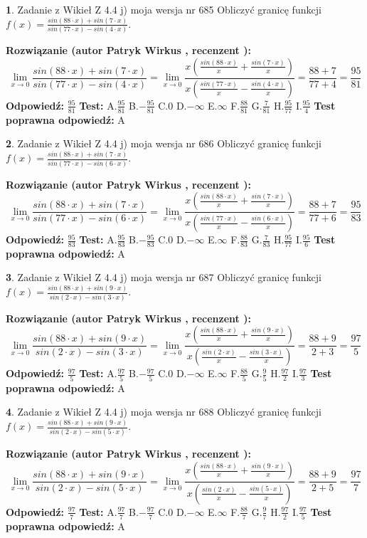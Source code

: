\documentclass[12pt, a4paper]{article}
\theoremstyle{definition} %
\newtheorem{zad}{}
\newcommand{\zadStart}[1]{\begin{zad}#1\newline}
\newcommand{\zadStop}{\end{zad}}
\newcommand{\rozwStart}[2]{\noindent \textbf{Rozwiązanie (autor #1 , recenzent #2): }\newline}
\newcommand{\rozwStop}{\newline}
\newcommand{\odpStart}{\noindent \textbf{Odpowiedź:}\newline}
\newcommand{\odpStop}{\newline}
\newcommand{\testStart}{\noindent \textbf{Test:}\newline}
\newcommand{\testStop}{\newline}
\newcommand{\kluczStart}{\noindent \textbf{Test poprawna odpowiedź:}\newline}
\newcommand{\kluczStop}{\newline}
\begin{document}
\zadStart{Zadanie z Wikieł Z 4.4 j) moja wersja nr 685}
Obliczyć granicę funkcji $f(x)=\frac{sin(88\cdot x) +sin(7\cdot x)}{sin(77\cdot x) -sin(4\cdot x)}$.
\zadStop
\rozwStart{Patryk Wirkus}{}
$$\lim\limits_{x\to 0}\frac{sin(88\cdot x) +sin(7\cdot x)}{sin(77\cdot x) -sin(4\cdot x)}=\lim\limits_{x\to 0}\frac{x(\frac{sin(88\cdot x)}{x}+\frac{sin(7\cdot x)}{x})}{x(\frac{sin(77\cdot x)}{x}-\frac{sin(4\cdot x)}{x})}=\frac{88+7}{77+4} = \frac{95}{81}$$
\rozwStop
\odpStart
$\frac{95}{81}$
\odpStop
\testStart
A.$\frac{95}{81}$
B.$-\frac{95}{81}$
C.$0$
D.$-\infty$
E.$\infty$
F.$\frac{88}{81}$
G.$\frac{7}{81}$
H.$\frac{95}{77}$
I.$\frac{95}{4}$
\testStop
\kluczStart
A
\kluczStop



\zadStart{Zadanie z Wikieł Z 4.4 j) moja wersja nr 686}
Obliczyć granicę funkcji $f(x)=\frac{sin(88\cdot x) +sin(7\cdot x)}{sin(77\cdot x) -sin(6\cdot x)}$.
\zadStop
\rozwStart{Patryk Wirkus}{}
$$\lim\limits_{x\to 0}\frac{sin(88\cdot x) +sin(7\cdot x)}{sin(77\cdot x) -sin(6\cdot x)}=\lim\limits_{x\to 0}\frac{x(\frac{sin(88\cdot x)}{x}+\frac{sin(7\cdot x)}{x})}{x(\frac{sin(77\cdot x)}{x}-\frac{sin(6\cdot x)}{x})}=\frac{88+7}{77+6} = \frac{95}{83}$$
\rozwStop
\odpStart
$\frac{95}{83}$
\odpStop
\testStart
A.$\frac{95}{83}$
B.$-\frac{95}{83}$
C.$0$
D.$-\infty$
E.$\infty$
F.$\frac{88}{83}$
G.$\frac{7}{83}$
H.$\frac{95}{77}$
I.$\frac{95}{6}$
\testStop
\kluczStart
A
\kluczStop



\zadStart{Zadanie z Wikieł Z 4.4 j) moja wersja nr 687}
Obliczyć granicę funkcji $f(x)=\frac{sin(88\cdot x) +sin(9\cdot x)}{sin(2\cdot x) -sin(3\cdot x)}$.
\zadStop
\rozwStart{Patryk Wirkus}{}
$$\lim\limits_{x\to 0}\frac{sin(88\cdot x) +sin(9\cdot x)}{sin(2\cdot x) -sin(3\cdot x)}=\lim\limits_{x\to 0}\frac{x(\frac{sin(88\cdot x)}{x}+\frac{sin(9\cdot x)}{x})}{x(\frac{sin(2\cdot x)}{x}-\frac{sin(3\cdot x)}{x})}=\frac{88+9}{2+3} = \frac{97}{5}$$
\rozwStop
\odpStart
$\frac{97}{5}$
\odpStop
\testStart
A.$\frac{97}{5}$
B.$-\frac{97}{5}$
C.$0$
D.$-\infty$
E.$\infty$
F.$\frac{88}{5}$
G.$\frac{9}{5}$
H.$\frac{97}{2}$
I.$\frac{97}{3}$
\testStop
\kluczStart
A
\kluczStop



\zadStart{Zadanie z Wikieł Z 4.4 j) moja wersja nr 688}
Obliczyć granicę funkcji $f(x)=\frac{sin(88\cdot x) +sin(9\cdot x)}{sin(2\cdot x) -sin(5\cdot x)}$.
\zadStop
\rozwStart{Patryk Wirkus}{}
$$\lim\limits_{x\to 0}\frac{sin(88\cdot x) +sin(9\cdot x)}{sin(2\cdot x) -sin(5\cdot x)}=\lim\limits_{x\to 0}\frac{x(\frac{sin(88\cdot x)}{x}+\frac{sin(9\cdot x)}{x})}{x(\frac{sin(2\cdot x)}{x}-\frac{sin(5\cdot x)}{x})}=\frac{88+9}{2+5} = \frac{97}{7}$$
\rozwStop
\odpStart
$\frac{97}{7}$
\odpStop
\testStart
A.$\frac{97}{7}$
B.$-\frac{97}{7}$
C.$0$
D.$-\infty$
E.$\infty$
F.$\frac{88}{7}$
G.$\frac{9}{7}$
H.$\frac{97}{2}$
I.$\frac{97}{5}$
\testStop
\kluczStart
A
\kluczStop
\end{document}
